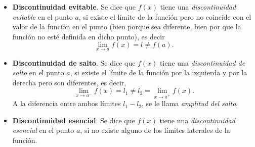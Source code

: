 \begin{itemize}
\item \textbf{Discontinuidad evitable}. Se dice que $f(x)$ tiene una \emph{discontinuidad evitable} en el punto $a$, si existe el límite de la función  pero no coincide con el valor de la función en el punto (bien porque sea diferente, bien por que la función no esté definida en dicho punto), es decir
\[\lim_{x\rightarrow a}f(x)=l\neq f(a).\]

\item \textbf{Discontinuidad de salto}. Se dice que $f(x)$ tiene una \emph{discontinuidad de salto} en el punto $a$, si existe el límite de la función por la izquierda  y por la derecha pero son diferentes, es decir,
\[
\lim_{x\rightarrow a^-}f(x)=l_1\neq l_2=\lim_{x\rightarrow a^+}f(x).
\]
A la diferencia entre ambos límites $l_1-l_2$, se le llama
\emph{amplitud del salto}.

\item \textbf{Discontinuidad esencial}. Se dice que $f(x)$ tiene una \emph{discontinuidad esencial} en el punto $a$, si no existe alguno de los límites laterales de la función.
\end{itemize}

\newpage

